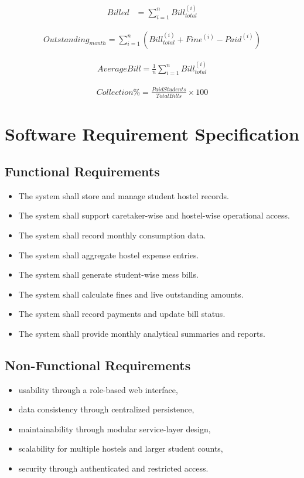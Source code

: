 \documentclass[conference]{IEEEtran}
\begin{document}
\begin{align}
Billed &= \sum_{i=1}^{n} Bill_{total}^{(i)}
\end{align}

\begin{align}
Outstanding_{month} = \sum_{i=1}^{n} \left(Bill_{total}^{(i)} + Fine^{(i)} - Paid^{(i)}\right)
\end{align}

\begin{align}
AverageBill = \frac{1}{n}\sum_{i=1}^{n} Bill_{total}^{(i)}
\end{align}

\begin{align}
Collection\% = \frac{PaidStudents}{TotalBills} \times 100
\end{align}

\section{Software Requirement Specification}
\subsection{Functional Requirements}
\begin{itemize}
\item The system shall store and manage student hostel records.
\item The system shall support caretaker-wise and hostel-wise operational access.
\item The system shall record monthly consumption data.
\item The system shall aggregate hostel expense entries.
\item The system shall generate student-wise mess bills.
\item The system shall calculate fines and live outstanding amounts.
\item The system shall record payments and update bill status.
\item The system shall provide monthly analytical summaries and reports.
\end{itemize}

\subsection{Non-Functional Requirements}
\begin{itemize}
\item usability through a role-based web interface,
\item data consistency through centralized persistence,
\item maintainability through modular service-layer design,
\item scalability for multiple hostels and larger student counts,
\item security through authenticated and restricted access.
\end{itemize}
\end{document}

